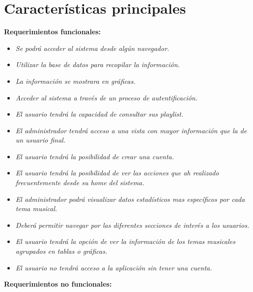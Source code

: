 \documentclass[12pt,a4paper]{book}
\begin{document}
\section{Características principales}
\vspace{0.5 cm}
\textbf {Requerimientos funcionales:}
\vspace{0.5 cm}
\begin{itemize}
\item \textit{Se podrá acceder al sistema desde algún navegador.}
\item \textit{Utilizar la base de datos para recopilar la información.}
\item \textit{La información se mostrara en gráficas.}
\item \textit{Acceder al sistema a través de un proceso de autentificación.}
\item \textit{El usuario tendrá la capacidad de consultar sus playlist.}
\item \textit{El administrador tendrá acceso a una vista con mayor información que la de un usuario final.}
\item \textit{El usuario tendrá la posibilidad de crear una cuenta.}
\item \textit{El usuario tendrá la posibilidad de ver las acciones que ah realizado frecuentemente desde su home del sistema.}
\item \textit{El administrador podrá visualizar datos estadísticos mas específicos por cada tema musical.}
\item \textit{Deberá permitir navegar por las diferentes secciones de interés a los usuarios.}
\item \textit{El usuario tendrá la opción de ver la información de los temas musicales agrupados en tablas o gráficas.}
\item \textit{El usuario no tendrá acceso a la aplicación sin tener una cuenta.}
\end{itemize}
\newpage
\textbf {Requerimientos no funcionales:}
\vspace{0.5 cm}
\end{document}
